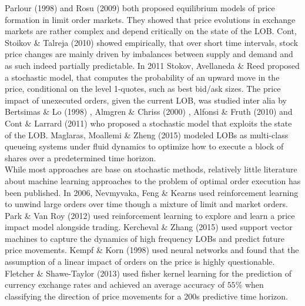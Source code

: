 Parlour (1998) \Cite{PriceDynamicsinLimitOrderMarkets} and Rosu (2009) \Cite{Rosu:adynamic} both proposed equilibrium models of price formation in limit order markets. They showed that price evolutions in exchange markets are rather complex and depend critically on the state of the \ac{LOB}. Cont, Stoikov \& Talreja (2010) \Cite{Cont10theprice} showed empirically, that over short time intervals, stock price changes are mainly driven by imbalances between supply and demand and as such indeed partially predictable. In 2011 Stokov, Avellaneda \& Reed \Cite{Stoikov10contents} proposed a stochastic model, that computes the probability of an upward move in the price, conditional on the level 1-quotes, such as best bid/ask sizes. The price impact of unexecuted orders, given the current \ac{LOB}, was studied inter alia by Bertsimas \& Lo (1998) \Cite{bertsimas1998:optimalControl}, Almgren \& Chriss (2000) \Cite{almgren2000:optimalExecution}, Alfonsi \& Fruth (2010) \Cite{alfonsi2009:optimalExecutionStrategies} and Cont \& Larrard (2011) \Cite{Cont:pricedynamics} who proposed a stochastic model that exploits the state of the \ac{LOB}. Maglaras, Moallemi \& Zheng (2015) \Cite{optimalExecutionInALimitOrderBook} modeled \ac{LOB}s as multi-class queueing systems under fluid dynamics to optimize how to execute a block of shares over a predetermined time horizon.\\

While most approaches are base on stochastic methods, relatively little literature about machine learning approaches to the problem of optimal order execution has been published. In 2006, Nevmyvaka, Feng \& Kearns \Cite{Nevmyvaka:2006} used reinforcement learning to unwind large orders over time though a mixture of limit and market orders. Park \& Van Roy (2012) \Cite{2012arXiv1207.6423P} used reinforcement learning to explore and learn a price impact model alongside trading. Kercheval \& Zhang (2015) \Cite{modellingHighFrequencyLOBdynamicsSVM} used support vector machines to capture the dynamics of high frequency \ac{LOB}s and predict future price movements. Kempf \& Korn (1998) \Cite{marketDepthOrderSizeNN} used neural networks and found that the assumption of a linear impact of orders on the price is highly questionable. Fletcher \& Shawe-Taylor (2013) \Cite{Fletcher2013} used fisher kernel learning for the prediction of currency exchange rates and achieved an average accuracy of $55\%$ when classifying the direction of price movements for a 200s predictive time horizon.\\

